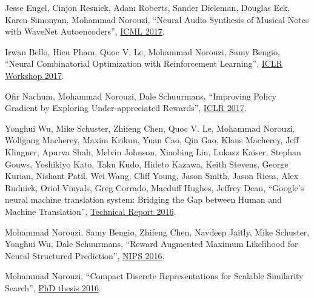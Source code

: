 \documentclass[10pt,letterpaper]{article}
\renewenvironment{itemize}{
  \begin{list}{}{
    \setlength{\leftmargin}{1.5em}
  }
}{
  \end{list}
}
\begin{document}
\begin{itemize}
\item Jesse Engel, Cinjon Resnick, Adam Roberts, Sander Dieleman, Douglas Eck, Karen Simonyan, Mohammad Norouzi,
``Neural Audio Synthesis of Musical Notes with WaveNet Autoencoders'',
\href{https://arxiv.org/pdf/1704.01279}%
{ICML 2017}.


\item Irwan Bello, Hieu Pham, Quoc V. Le, Mohammad Norouzi, Samy Bengio,
``Neural Combinatorial Optimization with Reinforcement Learning'',
\href{https://arxiv.org/pdf/1611.09940}%
{ICLR Workshop 2017}.

\item Ofir Nachum, Mohammad Norouzi, Dale Schuurmans,
``Improving Policy Gradient by Exploring Under-appreciated Rewards'',
\href{https://arxiv.org/pdf/1611.09321}{ICLR 2017}.

\item Yonghui Wu, Mike Schuster, Zhifeng Chen, Quoc V. Le, Mohammad Norouzi, Wolfgang Macherey, Maxim Krikun, Yuan Cao, Qin Gao, Klaus Macherey, Jeff Klingner, Apurva Shah, Melvin Johnson, Xiaobing Liu, Lukasz Kaiser, Stephan Gouws, Yoshikiyo Kato, Taku Kudo, Hideto Kazawa, Keith Stevens, George Kurian, Nishant Patil, Wei Wang, Cliff Young, Jason Smith, Jason Riesa, Alex Rudnick, Oriol Vinyals, Greg Corrado, Macduff Hughes, Jeffrey Dean,
``Google's neural machine translation system: Bridging the Gap between Human and Machine Translation'',
\href{https://arxiv.org/pdf/1609.08144}%
{Technical Report 2016}.
  
\item
Mohammad Norouzi, Samy Bengio, Zhifeng Chen, Navdeep Jaitly, Mike Schuster, Yonghui Wu, Dale Schuurmans,
``Reward Augmented Maximum Likelihood for Neural Structured Prediction'',
\href{https://arxiv.org/pdf/1609.00150.pdf}%
{NIPS 2016}.

\item
Mohammad Norouzi, ``Compact Discrete Representations for Scalable Similarity Search'',
\href{https://tspace.library.utoronto.ca/bitstream/1807/73095/3/Norouzi_Mohammad_201606_PhD_thesis.pdf}{PhD thesis 2016}.


\end{itemize}
\end{document}
